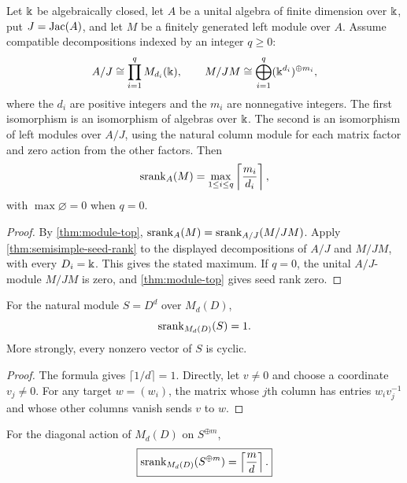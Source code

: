 \begin{corollary}
\label{cor:algebraically-closed-formula}
Let $\Bbbk$ be algebraically closed, let $A$ be a unital algebra of finite dimension over $\Bbbk$, put $J=\operatorname{Jac}(A)$, and let $M$ be a finitely generated left module over $A$.  Assume compatible decompositions indexed by an integer $q\geq0$:
\[
A/J\cong\prod_{i=1}^{q}M_{d_i}(\Bbbk),
\qquad
M/JM\cong\bigoplus_{i=1}^{q}(\Bbbk^{d_i})^{\oplus m_i},
\]
where the $d_i$ are positive integers and the $m_i$ are nonnegative integers.  The first isomorphism is an isomorphism of algebras over $\Bbbk$.  The second is an isomorphism of left modules over $A/J$, using the natural column module for each matrix factor and zero action from the other factors.  Then
\[
\operatorname{srank}_A(M)=\max_{1\leq i\leq q}\left\lceil\frac{m_i}{d_i}\right\rceil,
\]
with $\max\varnothing=0$ when $q=0$.
\end{corollary}

\begin{proof}
By \cref{thm:module-top}, $\operatorname{srank}_A(M)=\operatorname{srank}_{A/J}(M/JM)$.  Apply \cref{thm:semisimple-seed-rank} to the displayed decompositions of $A/J$ and $M/JM$, with every $D_i=\Bbbk$.  This gives the stated maximum.  If $q=0$, the unital $A/J$-module $M/JM$ is zero, and \cref{thm:module-top} gives seed rank zero.
\end{proof}

\begin{corollary}
\label{cor:full-matrix}
For the natural module $S=D^d$ over $M_d(D)$,
\[
\operatorname{srank}_{M_d(D)}(S)=1.
\]
More strongly, every nonzero vector of $S$ is cyclic.
\end{corollary}

\begin{proof}
The formula gives $\lceil1/d\rceil=1$.  Directly, let $v\neq0$ and choose a coordinate $v_j\neq0$.  For any target $w=(w_i)$, the matrix whose $j$th column has entries $w_iv_j^{-1}$ and whose other columns vanish sends $v$ to $w$.
\end{proof}

\begin{corollary}
\label{cor:multiplicity-obstruction}
For the diagonal action of $M_d(D)$ on $S^{\oplus m}$,
\[
\boxed{
\operatorname{srank}_{M_d(D)}(S^{\oplus m})
=
\left\lceil\frac{m}{d}\right\rceil.
}
\]
\end{corollary}

